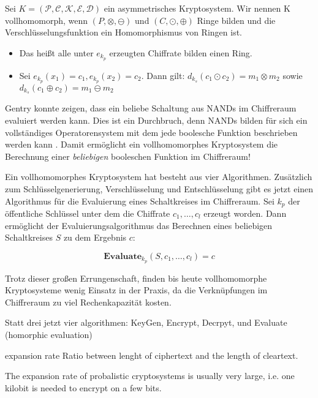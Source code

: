\begin{theorem}
	\label{PKS}
	Sei $K = (\mathcal{P},\mathcal{C},\mathcal{K},\mathcal{E},\mathcal{D})$ ein asymmetrisches Kryptosystem. Wir nennen K vollhomomorph, wenn $(P,\otimes,\ominus)$ und $(C,\odot,\oplus)$ Ringe bilden und die Verschlüsselungsfunktion ein Homomorphismus von Ringen ist. 
	\begin{itemize}
		\item Das heißt alle unter $e_{k_p}$ erzeugten Chiffrate bilden einen Ring.
		\item Sei $e_{k_p}(x_1)=c_1,e_{k_p}(x_2)=c_2$. Dann gilt: $d_{k_s}(c_1\odot c_2)= m_1\otimes m_2$ sowie $d_{k_s}(c_1\oplus c_2)= m_1\ominus m_2$
	\end{itemize}
\end{theorem}


Gentry konnte zeigen, dass ein beliebe Schaltung aus NANDs im Chiffreraum evaluiert werden kann. Dies ist ein Durchbruch, denn NANDs bilden für sich ein vollständiges Operatorensystem mit dem jede boolesche Funktion beschrieben werden kann \cite[p.129]{hoffmann2010grundlagen}. Damit ermöglicht ein vollhomomorphes Kryptosystem die Berechnung einer \textit{beliebigen} booleschen Funktion im Chiffreraum!

Ein vollhomomorphes Kryptosystem hat besteht aus vier Algorithmen. Zusätzlich zum Schlüsselgenerierung, Verschlüsselung und Entschlüsselung gibt es jetzt einen Algorithmus für die Evaluierung eines Schaltkreises im Chiffreraum. Sei $k_p$ der öffentliche Schlüssel unter dem die Chiffrate $c_1,\ldots,c_l$ erzeugt worden. Dann ermöglicht der Evaluierungsalgorithmus das Berechnen eines beliebigen Schaltkreises $S$ zu dem Ergebnis $c$:

\begin{equation*}
\textbf{Evaluate}_{k_p}(S,c_1,\ldots,c_l) = c
\end{equation*}

Trotz dieser großen Errungenschaft, finden bis heute vollhomomorphe Kryptosysteme wenig Einsatz in der Praxis, da die Verknüpfungen im Chiffreraum zu viel Rechenkapazität kosten. 


Statt drei jetzt vier algorithmen: KeyGen, Encrypt, Decrpyt, und Evaluate (homorphic evaluation) \cite{homomrphic encryption shcemes and applications for a secure digital worlds}

expansion rate
Ratio between lenght of ciphertext and the length of cleartext. \cite[p.63]{naccache1998new}

The expansion rate of probalistic cryptosystems is usually very large, i.e. one kilobit is needed to encrypt on a few bits.  \cite[p.60]{naccache1998new}

